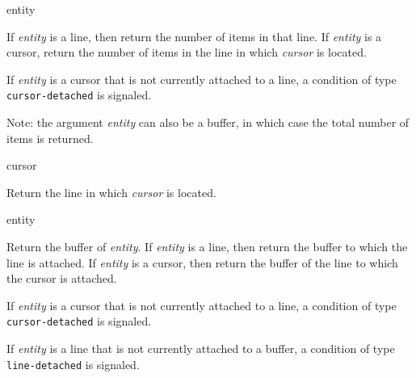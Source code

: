  {entity}

If \textit{entity} is a line, then return the number of items in that
line.  If \textit{entity} is a cursor, return the number of items in
the line in which \textit{cursor} is located.

If \textit{entity} is a cursor that is not currently attached to a
line, a condition of type \texttt{cursor-detached} is signaled.

Note: the argument \textit{entity} can also be a buffer, in which case
the total number of items is returned.

 {cursor}

Return the line in which \textit{cursor} is located. 

\ifdetached{}

 {entity}

Return the buffer of \textit{entity}.  If \textit{entity} is a line,
then return the buffer to which the line is attached.  If
\textit{entity} is a cursor, then return the buffer of the line to
which the cursor is attached.

If \textit{entity} is a cursor that is not currently attached to a
line, a condition of type \texttt{cursor-detached} is signaled.

If \textit{entity} is a line that is not currently attached to a
buffer, a condition of type \texttt{line-detached} is signaled.
